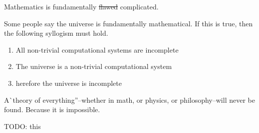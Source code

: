 \documentclass[11pt, letterpaper, twoside, openright]{book}
\begin{document}
Mathematics is fundamentally \sout{flawed} complicated.

Some people say the universe is fundamentally mathematical. If this is true, then the following syllogism must hold.
\begin{enumerate}
\item All non-trivial computational systems are incomplete
\item The universe is a non-trivial computational system
\item herefore the universe is incomplete
\end{enumerate}

A\`{ }theory of everything''--whether in math, or physics, or philosophy--will never be found. Because it is impossible.

TODO: this
\end{document}
